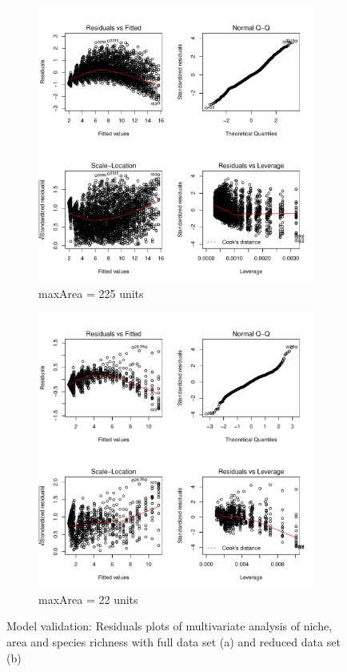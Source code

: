 \documentclass{article}
\begin{document}
\begin{figure}[h!]
  \centering
  \begin{subfigure}[b]{0.4\linewidth}
    \includegraphics[width=\linewidth]{../../Results/Simulation/NicheAreaLmPlot_1.pdf}
    \caption{maxArea = 225 units}
  \end{subfigure}
  \begin{subfigure}[b]{0.4\linewidth}
    \includegraphics[width=\linewidth]{../../Results/Simulation/NicheAreaLmPlot_10.pdf}
    \caption{maxArea = 22 units}
  \end{subfigure}
  \caption{Model validation: Residuals plots of multivariate analysis of niche, area and species richness with full data set (a) and reduced data set (b)}
  \label{fig:Model validation multivariate 2}
\end{figure}
\end{document}
